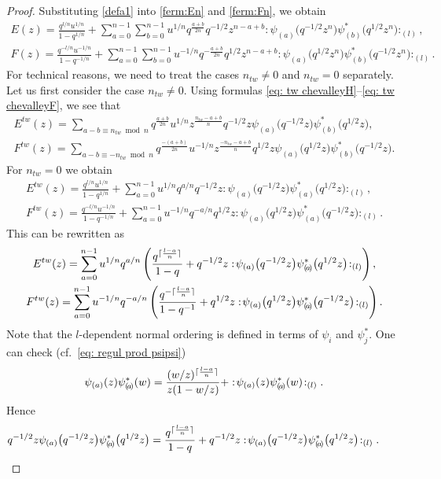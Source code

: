 \documentclass[pdftex]{sigma}
\numberwithin{equation}{section}
\theoremstyle{definition}
\DeclarePairedDelimiter\ceil{\lceil}{\rceil}
\newcommand{\psia}{\psi_{({a})}}
\newcommand{\psiaa}{\psi^*_{( \! a \! )}}
\newcommand{\psib}{\psi^*_{( b )}}
\begin{document}
\begin{proof}
Substituting \eqref{defa1} into \eqref{ferm:En} and \eqref{ferm:Fn}, we obtain
\begin{gather*}
E(z) = \frac{q^{l/n} u^{1/n} }{1-q^{1/n}} + \sum_{a=0}^{n-1} \sum_{b=0}^{n-1} u^{1/n} q^{\frac{a+b}{2n}} q^{-1/2} z^{n-a+b} : \! \psia \big( q^{-1/2} z^n\big) \psib \big(q^{1/2} z^n\big) \! :_{(l)}, \\
F(z) = \frac{q^{-l/n} u^{-1/n} }{1-q^{-1/n}} + \sum_{a=0}^{n-1} \sum_{b=0}^{n-1} u^{-1/n} q^{- \frac{a+b}{2n}} q^{1/2} z^{n-a+b} : \! \psia \big( q^{1/2} z^n \big) \psib \big(q^{-1/2} z^n \big)\!:_{(l)}.
\end{gather*}
For technical reasons, we need to treat the cases $n_{tw} \neq 0$ and $n_{tw} =0$ separately. Let us first consider the case $n_{tw} \neq 0$. Using formulas \eqref{eq: tw chevalleyH}--\eqref{eq: tw chevalleyF}, we see that
\begin{gather*}
E^{tw}(z) = \sum_{a-b \equiv n_{tw} \bmod n} \! \! q^{\frac{a+b}{2n}} u^{1/n} z^{\frac{n_{tw}-a+b}{n}} q^{-1/2} z \psia \big( q^{-1/2} z\big) \psib \big(q^{1/2} z\big), \\
F^{tw} (z) = \sum_{a-b \equiv -n_{tw} \bmod n} \! \!q^{\frac{-(a+b)}{2n}} u^{-1/n} z^{\frac{-n_{tw}-a+b}{n}} q^{1/2} z \psia \big( q^{1/2} z \big) \psib \big(q^{-1/2} z \big) .
\end{gather*}
For $n_{tw}=0$ we obtain
\begin{gather*}
E^{tw}(z) = \frac{q^{l/n} u^{1/n} }{1-q^{1/n}} + \sum_{a=0}^{n-1} u^{1/n} q^{a/n} q^{-1/2} z : \! \psia \big( q^{-1/2} z\big) \psiaa \big(q^{1/2} z\big) \! :_{(l)}, \\
F^{tw}(z) = \frac{q^{-l/n} u^{-1/n} }{1-q^{-1/n}} + \sum_{a=0}^{n-1} u^{-1/n} q^{-a/n} q^{1/2} z : \! \psia \big( q^{1/2} z \big) \psiaa \big(q^{-1/2} z \big)\!:_{(l)}.
\end{gather*}
This can be rewritten as
\begin{gather*}
E^{tw}(z) = \sum_{a=0}^{n-1} u^{1/n} q^{a/n} \left( \frac{q^{ \ceil{\frac{l-a}{n}} }}{1-q} +q^{-1/2} z : \! \psia \big( q^{-1/2} z\big) \psiaa \big(q^{1/2} z\big) \! :_{(l)} \right), \\
F^{tw}(z) = \sum_{a=0}^{n-1} u^{-1/n} q^{-a/n} \left( \frac{q^{- \ceil{\frac{l-a}{n}} }}{1-q^{-1}} + q^{1/2} z : \! \psia \big( q^{1/2} z \big) \psiaa \big(q^{-1/2} z \big)\!:_{(l)} \right) .
\end{gather*}
Note that the $l$-dependent normal ordering is defined in terms of $\psi_i$ and $\psi^*_j$. One can check (cf.~\eqref{eq: regul prod psipsi})
\begin{align} \label{eq: psia OPE}
\psia(z) \psiaa(w) = \frac{(w/z)^{\ceil{\frac{l-a}{n}} }}{z(1-w/z)} + : \! \psia (z) \psiaa (w) \! :_{(l)}.
\end{align}
Hence
\begin{equation*}
q^{-1/2} z \psia\big(q^{-1/2}z\big) \psiaa\big(q^{1/2}z\big) = \frac{q^{\ceil{\frac{l-a}{n}} }}{1-q} + q^{-1/2} z : \! \psia \big(q^{-1/2}z\big) \psiaa \big(q^{1/2}z\big) \! :_{(l)}.\tag*{\qed}
\end{equation*}\renewcommand{\qed}{}
\end{proof}
\end{document}
